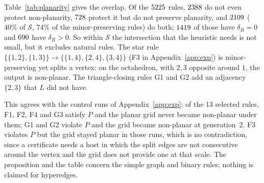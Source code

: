 \documentclass[10pt]{article}
\theoremstyle{definition}
\theoremstyle{plain}
\theoremstyle{remark}
\begin{document}
\begin{table}[t]\centering\scriptsize

\caption{Planarity preservation within $\mathcal S$ (Theorem~\ref{thm:planarity}). Every planarity-preserving rule is simple-minor-preserving (Proposition~\ref{prop:Pplanar}); the last column counts the simple-minor-preserving rules that nevertheless fail to preserve planarity.}\label{tab:planarity}
\end{table}

Table~\ref{tab:planarity} gives the overlap. Of the $5225$ rules, $2388$ do not even protect non-planarity, $728$ protect it but do not preserve planarity, and $2109$ ($40\%$ of $\mathcal S$, $74\%$ of the minor-preserving rules) do both; $1419$ of those have $\delta_R=0$ and $690$ have $\delta_R>0$. So within $\mathcal S$ the intersection that the heuristic needs is not small, but it excludes natural rules. The star rule $\{\{1,2\},\{1,3\}\}\to\{\{1,4\},\{2,4\},\{3,4\}\}$ (F3 in Appendix~\ref{app:exp}) is minor-preserving yet splits a vertex: on the octahedron, with $2,3$ opposite around $1$, the output is non-planar. The triangle-closing rules G1 and G2 add an adjacency $\{2,3\}$ that $L$ did not have.

This agrees with the control runs of Appendix~\ref{app:exp}: of the 13 selected rules, F1, F2, F4 and G3 satisfy $P$ and the planar grid never became non-planar under them; G1 and G2 violate $P$ and the grid became non-planar at generation~2. F3 violates $P$ but the grid stayed planar in those runs, which is no contradiction, since a certificate needs a host in which the split edges are not consecutive around the vertex and the grid does not provide one at that scale. The proposition and the table concern the simple graph and binary rules; nothing is claimed for hyperedges.

\end{document}
